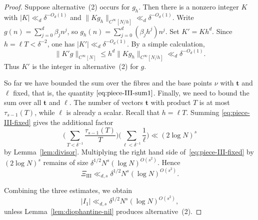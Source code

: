 \begin{proof}
Suppose alternative~(2) occurs for $g_h$.
Then there is a nonzero integer $K$ with $|K|\ll_d\delta^{-O_d(1)}$ and $\|Kg_h\|_{C^\infty[N/h]}\ll_d\delta^{-O_d(1)}$.
Write $g(n)=\sum_{j=0}^d\beta_j n^j$, so $g_h(n)=\sum_{j=0}^d(\beta_j h^j)n^j$.
Set $K'=Kh^d$.
Since $h=\ell T<\delta^{-2}$, one has $|K'|\ll_d\delta^{-O_d(1)}$.
By a simple calculation,
\[
\|K'g\|_{C^\infty[N]}
\leq h^d\|Kg_h\|_{C^\infty[N/h]}
\ll_d\delta^{-O_d(1)}.
\]
Thus $K'$ is the integer in alternative~(2) for $g$.

So far we have bounded the sum over the fibres and the base points $\nu$ with  $\mathbf t$ and $\ell$ fixed, that is, the quantity $\eqref{eq:piece-III-sum1}$. 
Finally, we need to bound the sum over all $\mathbf t$ and $\ell$.
The number of vectors $\mathbf t$ with product $T$ is at most
$\tau_{s-1}(T)$, while $\ell$ is already a scalar. 
Recall that $h=\ell T$.
Summing
\eqref{eq:piece-III-fixed} gives the additional factor
\[
\Biggl(\sum_{T<\delta^{-1}}\frac{\tau_{s-1}(T)}{T}\Biggr)
\Biggl(\sum_{\ell<\delta^{-1}}\frac1\ell\Biggr)
\ll (2\log N)^s
\]
by Lemma~\ref{lem:divisor}. 
  Multiplying the right hand side of~\eqref{eq:piece-III-fixed}
by $(2\log N)^s$ remains of size $\delta^{1/2}N^s(\log N)^{O(s^2)}$.   Hence
\[
\Xi_{\mathrm{III}}\ll_{d,s}\delta^{1/2} N^s(\log N)^{O(s^2)}.
\]

Combining the three estimates, we obtain
\[
|I_1|\ll_{d,s}\delta^{1/2} N^s(\log N)^{O(s^2)},
\]
unless Lemma~\ref{lem:diophantine-nil} produces alternative~(2).
\end{proof}

